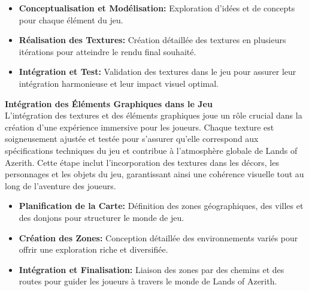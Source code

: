 \begin{itemize}

      \item \textbf{Conceptualisation et Modélisation:} Exploration d'idées et de concepts pour chaque élément du jeu.
            \\

      \item \textbf{Réalisation des Textures:} Création détaillée des textures en plusieurs itérations pour atteindre le rendu final souhaité.
            \\

      \item \textbf{Intégration et Test:} Validation des textures dans le jeu pour assurer leur intégration harmonieuse et leur impact visuel optimal.
            \\

\end{itemize}
\textbf{Intégration des Éléments Graphiques dans le Jeu}
\\

L'intégration des textures et des éléments graphiques joue un rôle crucial dans la création d'une expérience immersive pour les joueurs. Chaque texture est soigneusement ajustée et testée pour s'assurer qu'elle correspond aux spécifications techniques du jeu et contribue à l'atmosphère globale de Lands of Azerith. Cette étape inclut l'incorporation des textures dans les décors, les personnages et les objets du jeu, garantissant ainsi une cohérence visuelle tout au long de l'aventure des joueurs.
\\

\begin{itemize}

      \item \textbf{Planification de la Carte:} Définition des zones géographiques, des villes et des donjons pour structurer le monde de jeu.
            \\

      \item \textbf{Création des Zones:} Conception détaillée des environnements variés pour offrir une exploration riche et diversifiée.
            \\

      \item \textbf{Intégration et Finalisation:} Liaison des zones par des chemins et des routes pour guider les joueurs à travers le monde de Lands of Azerith.
            \\

\end{itemize}

